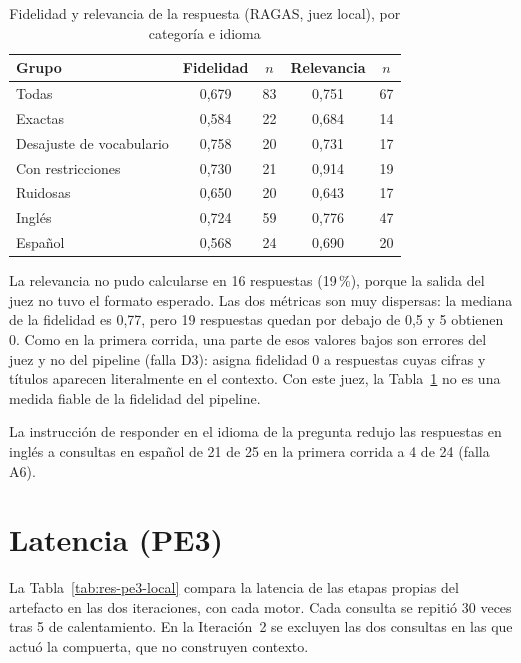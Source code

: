 \begin{table}[htbp!]
    \centering
    \caption{Fidelidad y relevancia de la respuesta (RAGAS, juez local), por categoría e idioma}
    \label{tab:res-pe2}
    \begin{tabular}{|l|c|c|c|c|}
        \hline
        \textbf{Grupo} & \textbf{Fidelidad} & \textbf{$n$} & \textbf{Relevancia} & \textbf{$n$} \\
        \hline
        Todas & 0{,}679 & 83 & 0{,}751 & 67 \\
        \hline
        Exactas & 0{,}584 & 22 & 0{,}684 & 14 \\
        \hline
        Desajuste de vocabulario & 0{,}758 & 20 & 0{,}731 & 17 \\
        \hline
        Con restricciones & 0{,}730 & 21 & 0{,}914 & 19 \\
        \hline
        Ruidosas & 0{,}650 & 20 & 0{,}643 & 17 \\
        \hline
        Inglés & 0{,}724 & 59 & 0{,}776 & 47 \\
        \hline
        Español & 0{,}568 & 24 & 0{,}690 & 20 \\
        \hline
    \end{tabular}
\end{table}

La relevancia no pudo calcularse en 16 respuestas (19\,\%), porque la salida del juez no tuvo el formato esperado. Las dos métricas son muy dispersas: la mediana de la fidelidad es 0,77, pero 19 respuestas quedan por debajo de 0,5 y 5 obtienen 0. Como en la primera corrida, una parte de esos valores bajos son errores del juez y no del pipeline (falla D3): asigna fidelidad 0 a respuestas cuyas cifras y títulos aparecen literalmente en el contexto. Con este juez, la Tabla~\ref{tab:res-pe2} no es una medida fiable de la fidelidad del pipeline.

La instrucción de responder en el idioma de la pregunta redujo las respuestas en inglés a consultas en español de 21 de 25 en la primera corrida a 4 de 24 (falla A6).


\section{Latencia (PE3)}
\label{sec:res-pe3}

La Tabla~\ref{tab:res-pe3-local} compara la latencia de las etapas propias del artefacto en las dos iteraciones, con cada motor. Cada consulta se repitió 30 veces tras 5 de calentamiento. En la Iteración~2 se excluyen las dos consultas en las que actuó la compuerta, que no construyen contexto.

